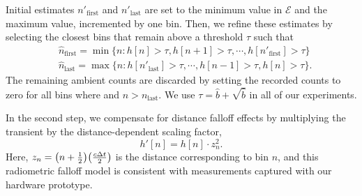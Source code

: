 Initial estimates $n'_\text{first}$ and $n'_\text{last}$ are set to the minimum
value in $\mathcal{E}$ and the maximum value, incremented by one bin. 
Then, we refine these estimates by selecting the closest bins that remain above
a threshold $\tau$ such that
\begin{equation}
    \begin{split}
        &\hat n_\text{first}=\min\{n : h[n] > \tau, h[n+1] > \tau,
            \cdots, h[n'_\text{first}] > \tau\}\\
        &\hat n_\text{last}=\max\{n : h[n'_\text{last}] > \tau,
    \cdots, h[n-1] > \tau, h[n] > \tau\}.
    \end{split}
\end{equation}
The remaining ambient counts are discarded by setting the recorded counts to
zero for all bins where  and $n > n_\text{last}$. We use 
$\tau = \hat b + \sqrt{\hat b}$ in all of our experiments.


\vspace{0.8em}
In the second step, we compensate for distance falloff effects by multiplying
the transient
by the distance-dependent scaling factor,
\begin{equation}
    h'[n] = h[n] \cdot z_n^2.
  \label{eq:h_scaled}
\end{equation}
Here, $z_n= \paren*{n + \frac12}\paren*{\frac{c\Delta t}{2}}$ is the distance
corresponding to bin $n$, and this radiometric falloff model is consistent with
measurements captured with our hardware prototype.

